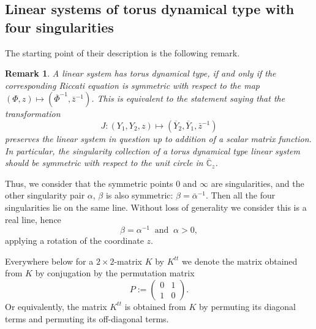 \documentclass[preprint,12pt]{elsarticle}
\theoremstyle{plain}
\newtheorem{remark}[theorem]{Remark}
\numberwithin{equation}{section}
\numberwithin{equation}{section}
\begin{document}
\subsection{Linear systems  of torus dynamical type with four singularities}

The starting point of their description is the following remark. 

\begin{remark} \label{remsym} A linear system has torus dynamical type, if and only if the corresponding Riccati equation 
is symmetric with respect to the map 
$(\Phi,z)\mapsto(\overline\Phi^{-1},\bar z^{-1})$. This is equivalent to the statement saying that the transformation 
\begin{equation} J:(Y_1,Y_2,z)\mapsto(\overline Y_2,\overline Y_1, \bar z^{-1})\label{barsym}
\end{equation}
preserves the linear system in question up to addition of a scalar matrix function. In particular, the singularity 
collection of a torus dynamical type linear system should be symmetric with respect to the unit circle in $\overline{\mathbb{C}}_z$. 
\end{remark}

Thus, we consider that the symmetric points $0$ and $\infty$ are singularities, 
and the other singularity pair $\alpha$, $\beta$ is also symmetric: $\beta=\bar\alpha^{-1}$. Then all the four singularities lie on the same line. 
Without loss of generality we consider this is a real line, hence 
$$\beta=\alpha^{-1} \ \text{ and } \ \alpha>0,$$
applying a rotation of the coordinate $z$. 

Everywhere below for a $2\times2$-matrix $K$ by $K^{tt}$ we denote the matrix obtained from $K$ by 
conjugation by the permutation matrix 
$$P:=\left(\begin{matrix} 0 & 1 \\ 1 & 0\end{matrix}\right).$$
Or equivalently, the matrix $K^{tt}$ is obtained from $K$ by permuting its diagonal terms and permuting 
its off-diagonal terms. 
\end{document}
